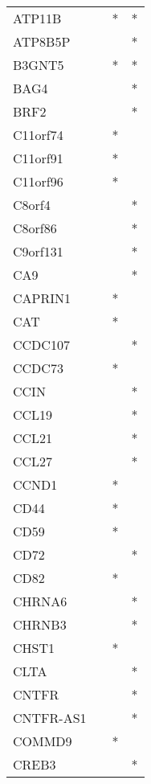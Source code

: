 \begin{longtable}{lccc}
ATP11B        &       &  * &       * \\
ATP8B5P       &       &    &       * \\
B3GNT5        &       &  * &       * \\
BAG4          &       &    &       * \\
BRF2          &       &    &       * \\
C11orf74      &       &  * &         \\
C11orf91      &       &  * &         \\
C11orf96      &       &  * &         \\
C8orf4        &       &    &       * \\
C8orf86       &       &    &       * \\
C9orf131      &       &    &       * \\
CA9           &       &    &       * \\
CAPRIN1       &       &  * &         \\
CAT           &       &  * &         \\
CCDC107       &       &    &       * \\
CCDC73        &       &  * &         \\
CCIN          &       &    &       * \\
CCL19         &       &    &       * \\
CCL21         &       &    &       * \\
CCL27         &       &    &       * \\
CCND1         &       &  * &         \\
CD44          &       &  * &         \\
CD59          &       &  * &         \\
CD72          &       &    &       * \\
CD82          &       &  * &         \\
CHRNA6        &       &    &       * \\
CHRNB3        &       &    &       * \\
CHST1         &       &  * &         \\
CLTA          &       &    &       * \\
CNTFR         &       &    &       * \\
CNTFR-AS1     &       &    &       * \\
COMMD9        &       &  * &         \\
CREB3         &       &    &       * \\

\end{longtable}
